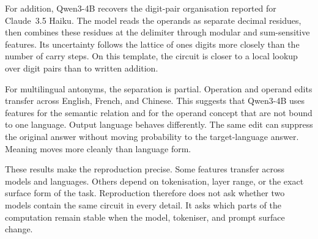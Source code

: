 For addition, Qwen3-4B recovers the digit-pair organisation reported for
Claude~3.5 Haiku.  The model reads the operands as separate decimal residues,
then combines these residues at the delimiter through modular and sum-sensitive
features.
Its uncertainty follows the lattice of ones digits more closely than the number
of carry steps.  On this template, the circuit is closer to a local lookup over
digit pairs than to written addition.

For multilingual antonyms, the separation is partial.  Operation and operand
edits transfer across English, French, and Chinese.  This suggests that Qwen3-4B
uses features for the semantic relation and for the operand concept that are not
bound to one language.  Output language behaves differently.  The same edit can
suppress the original answer without moving probability to the target-language
answer.  Meaning moves more cleanly than language form.

These results make the reproduction precise.  Some features transfer across
models and languages.  Others depend on tokenisation, layer range, or the exact
surface form of the task.  Reproduction therefore does not ask whether two
models contain the same circuit in every detail.  It asks which parts of the
computation remain stable when the model, tokeniser, and prompt surface change.

